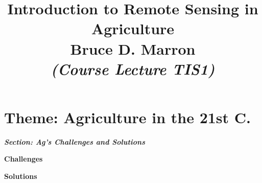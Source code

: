 \documentclass[12pt, letterpaper]{article}
\title{\vspace{-5mm}\fontsize{14pt}{12pt}
                    \selectfont \textbf{Introduction to Remote Sensing in Agriculture}\\  %
                   \vspace{2mm}
                   Bruce D. Marron \\
                  \textit{(Course Lecture TIS1)}
      }
\author{
     \vspace{-1mm}
}
\date{}
\begin{document}
\begin{doublespacing}
\maketitle                                      %
 \vspace{-20mm}
\end{doublespacing}
\thispagestyle{fancy}                            %
\linenumbers                                    %


\section{Theme: Agriculture in the 21st C.}

\large
\begin{flushleft}
\textbf{\textit{Section: Ag's Challenges and Solutions}}
\end{flushleft}
\normalsize


\pagebreak
\thispagestyle{plain} 
\textbf{Challenges}



\pagebreak
\thispagestyle{plain} 
\textbf{Solutions}



\clearpage 
\thispagestyle{plain} 
\printbibliography
\end{document}
